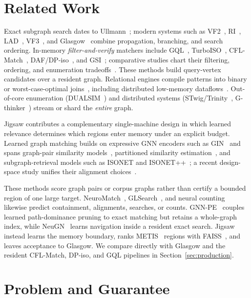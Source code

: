 \documentclass{article}
\begin{document}
\section{Related Work}

Exact subgraph search dates to Ullmann~\cite{ref_ullmann}; modern systems such as VF2~\cite{ref_vf2}, RI~\cite{ref_ri}, LAD~\cite{ref_lad}, VF3~\cite{ref_vf3}, and Glasgow~\cite{ref_glasgow} combine propagation, branching, and search ordering. In-memory \emph{filter-and-verify} matchers include GQL~\cite{ref_graphql}, TurboISO~\cite{ref_turboiso}, CFL-Match~\cite{ref_cflmatch}, DAF/DP-iso~\cite{ref_daf}, and GSI~\cite{ref_gsi}; comparative studies chart their filtering, ordering, and enumeration tradeoffs~\cite{ref_survey,ref_survey2024}. These methods build query-vertex candidates over a resident graph. Relational engines compile patterns into binary or worst-case-optimal joins~\cite{ref_wcoj}, including distributed low-memory dataflows~\cite{ref_lowmem}. Out-of-core enumeration (DUALSIM~\cite{ref_dualsim}) and distributed systems (STwig/Trinity~\cite{ref_trinity}, G-thinker~\cite{ref_gthinker}) stream or shard the \emph{entire} graph.

Jigsaw contributes a complementary single-machine design in which learned relevance determines which regions enter memory under an explicit budget. Learned graph matching builds on expressive GNN encoders such as GIN~\cite{ref_gin} and spans graph-pair similarity models~\cite{ref_simgnn,ref_gmn}, partitioned similarity estimation~\cite{ref_psimgnn}, and subgraph-retrieval models such as ISONET and ISONET++~\cite{ref_isonet,ref_isonetpp}; a recent design-space study unifies their alignment choices~\cite{ref_neuraldesign}.

These methods score graph pairs or corpus graphs rather than certify a bounded region of one large target. NeuroMatch~\cite{ref_neuromatch}, GLSearch~\cite{ref_glsearch}, and neural counting~\cite{ref_nsic} likewise predict containment, alignments, searches, or counts. GNN-PE~\cite{ref_gnnpe} couples learned path-dominance pruning to exact matching but retains a whole-graph index, while NeuGN~\cite{ref_neugn} learns navigation inside a resident exact search. Jigsaw instead learns the memory boundary, ranks METIS~\cite{ref_metis} regions with FAISS~\cite{ref_faiss}, and leaves acceptance to Glasgow. We compare directly with Glasgow and the resident CFL-Match, DP-iso, and GQL pipelines in Section~\ref{sec:production}.

\section{Problem and Guarantee}
\end{document}
